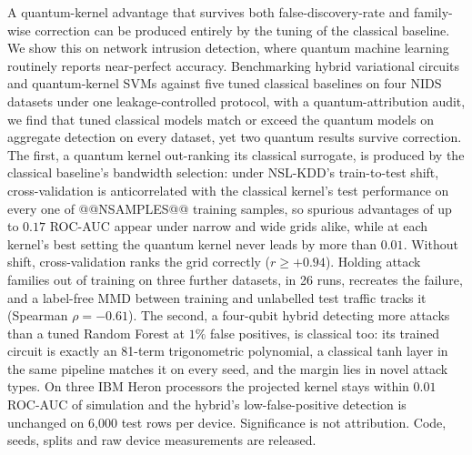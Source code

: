 A quantum-kernel advantage that survives both false-discovery-rate and family-wise correction can be
produced entirely by the tuning of the classical baseline. We show this on network intrusion detection,
where quantum machine learning routinely reports near-perfect accuracy. Benchmarking hybrid variational
circuits and quantum-kernel SVMs against five tuned classical baselines on four NIDS datasets under one
leakage-controlled protocol, with a quantum-attribution audit, we find that tuned classical models match
or exceed the quantum models on aggregate detection on every dataset, yet two quantum results survive
correction. The first, a quantum kernel out-ranking its classical surrogate, is produced by the classical
baseline's bandwidth selection: under NSL-KDD's train-to-test shift, cross-validation is anticorrelated
with the classical kernel's test performance on every one of @@NSAMPLES@@ training samples, so spurious
advantages of up to $0.17$ ROC-AUC appear under narrow and wide grids alike, while at each kernel's best
setting the quantum kernel never leads by more than $0.01$. Without shift, cross-validation ranks the grid
correctly ($r\ge+0.94$). Holding attack families out of training on three further datasets, in 26 runs,
recreates the failure, and a label-free MMD between training and unlabelled test traffic tracks it
(Spearman $\rho=-0.61$). The second, a four-qubit hybrid detecting more attacks than a tuned Random
Forest at $1\%$ false positives, is classical too: its trained circuit is exactly an 81-term trigonometric
polynomial, a classical tanh layer in the same pipeline matches it on every seed, and the margin lies in
novel attack types. On three IBM Heron processors the projected kernel stays within $0.01$ ROC-AUC of
simulation and the hybrid's low-false-positive detection is unchanged on 6{,}000 test rows per device.
Significance is not attribution. Code, seeds, splits and raw device measurements are released.

